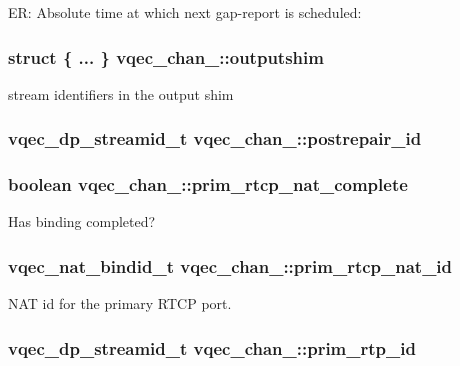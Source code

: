 ER: Absolute time at which next gap-report is scheduled: 
\subsubsection{\setlength{\rightskip}{0pt plus 5cm}struct \{ ... \}   \bf{vqec\_\-chan\_\-::outputshim}}\label{structvqec__chan___a417422079dedf97c39b0a8105041549}


stream identifiers in the output shim 
\subsubsection{\setlength{\rightskip}{0pt plus 5cm}vqec\_\-dp\_\-streamid\_\-t \bf{vqec\_\-chan\_\-::postrepair\_\-id}}\label{structvqec__chan___bb77397d473b1f3c7a734326e266ed23}


\subsubsection{\setlength{\rightskip}{0pt plus 5cm}boolean \bf{vqec\_\-chan\_\-::prim\_\-rtcp\_\-nat\_\-complete}}\label{structvqec__chan___b19f66926b911bc0c9a7773106ccc3b1}


Has binding completed? 
\subsubsection{\setlength{\rightskip}{0pt plus 5cm}vqec\_\-nat\_\-bindid\_\-t \bf{vqec\_\-chan\_\-::prim\_\-rtcp\_\-nat\_\-id}}\label{structvqec__chan___07f07e85a24a048d95580b005bebb7c0}


NAT id for the primary RTCP port. 
\subsubsection{\setlength{\rightskip}{0pt plus 5cm}vqec\_\-dp\_\-streamid\_\-t \bf{vqec\_\-chan\_\-::prim\_\-rtp\_\-id}}\label{structvqec__chan___f8283863ab586fe2c2ac780ba6bf14c8}


